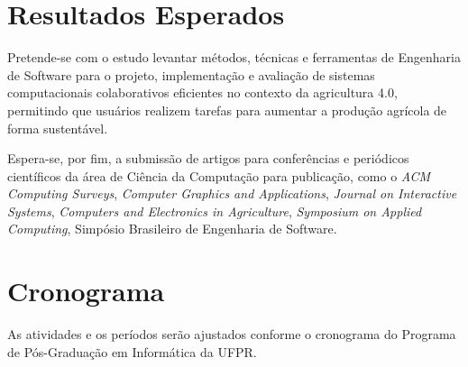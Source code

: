 \documentclass[12pt]{article}
\begin{document}
\section{Resultados Esperados}
\label{sec:resultados_esperados}

Pretende-se com o estudo levantar métodos, técnicas e ferramentas de Engenharia de Software para o projeto, implementação e avaliação de sistemas computacionais colaborativos eficientes no contexto da agricultura 4.0, permitindo que usuários realizem tarefas para aumentar a produção agrícola de forma sustentável.

Espera-se, por fim, a submissão de artigos para conferências e periódicos científicos da área de Ciência da Computação para publicação, como o \textit{ACM Computing Surveys}, \textit{Computer Graphics and Applications}, \textit{Journal on Interactive Systems}, \textit{Computers and Electronics in Agriculture}, \textit{Symposium on Applied Computing}, Simpósio Brasileiro de Engenharia de Software.

\section{Cronograma}
\label{sec:cronograma}

As atividades e os períodos serão ajustados conforme o cronograma do Programa de Pós-Graduação em Informática da UFPR.
\end{document}

